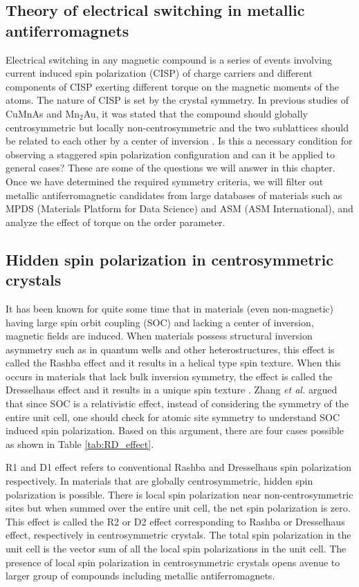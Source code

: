 \documentclass[11pt,edeposit,draftthesis]{uiucthesis2020}
\begin{document}
\begin{mainmatter}
\chapter{Theory of electrical switching in metallic antiferromagnets}

Electrical switching in any magnetic compound is a series of events involving current induced spin polarization (CISP) of charge carriers and different components of CISP exerting different torque on the magnetic moments of the atoms. The nature of CISP is set by the crystal symmetry. In previous studies of CuMnAs and Mn$_2$Au, it was stated that the compound should globally centrosymmetric but locally non-centrosymmetric and the two sublattices should be related to each other by a center of inversion \cite{Zelezny2014,Zelezny2017,Wadley2016}. Is this a necessary condition for observing a staggered spin polarization configuration and can it be applied to general cases? These are some of the questions we will answer in this chapter. Once we have determined the required symmetry criteria, we will filter out metallic antiferromagnetic candidates from large databases of materials such as MPDS (Materials Platform for Data Science) and ASM (ASM International), and analyze the effect of torque on the order parameter.

\section{Hidden spin polarization in centrosymmetric crystals}

It has been known for quite some time that in materials (even non-magnetic) having large spin orbit coupling (SOC) and lacking a center of inversion, magnetic fields are induced. When materials possess structural inversion asymmetry such as in quantum wells and other heterostructures, this effect is called the Rashba effect and it results in a helical type spin texture. When this occurs in materials that lack bulk inversion symmetry, the effect is called the Dresselhaus effect and it results in a unique spin texture \cite{Zhang2014}. Zhang \emph{et al.} \cite{Zhang2014} argued that since SOC is a relativistic effect, instead of considering the symmetry of the entire unit cell, one should check for atomic site symmetry to understand SOC induced spin polarization. Based on this argument, there are four cases possible as shown in Table \ref{tab:RD_effect}.

R1 and D1 effect refers to conventional Rashba and Dresselhaus spin polarization respectively. In materials that are globally centrosymmetric, hidden spin polarization is possible. There is local spin polarization near non-centrosymmetric sites but when summed over the entire unit cell, the net spin polarization is zero. This effect is called the R2 or D2 effect corresponding to Rashba or Dresselhaus effect, respectively in centrosymmetric crystals. The total spin polarization in the unit cell is the vector sum of all the local spin polarizations in the unit cell. The presence of local spin polarization in centrosymmetric crystals opens avenue to larger group of compounds including metallic antiferromagnets.



\end{mainmatter}
\end{document}
